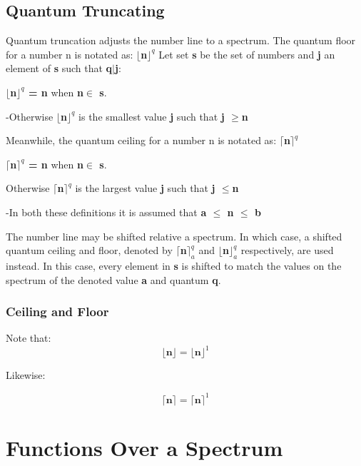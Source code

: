 \documentclass[12pt]{scrreprt}
\begin{document}
\section{Quantum Truncating}
Quantum truncation adjusts the number line to a spectrum. 
The quantum floor for a number n is notated as: \textbf{$\lfloor$n$\rfloor^q$}\newline
Let set \textbf{s} be the set of numbers and \textbf{j} an element of \textbf{s} such that \textbf{q$|$j}:\begin{center} \textbf{$\lfloor$n$\rfloor^q $ = n } when \textbf{n$\in$ s}.\end{center}\begin{center} -Otherwise \textbf{$\lfloor$n$\rfloor^q $} is the smallest value  \textbf{j} such that \textbf{j $\geq$n}\end{center}
Meanwhile, the quantum ceiling for a number n is notated as: \textbf{$\lceil$n$\rceil^q$}\newline
\begin{center} \textbf{$\lceil$n$\rceil^q $ = n } when \textbf{n$\in$ s}.\end{center}\begin{center} Otherwise \textbf{$\lceil$n$\rceil^q $} is the largest value  \textbf{j} such that \textbf{j $\leq$n}\end{center}\begin{center} -In both these definitions it is assumed that \textbf{a $\leq$ n $\leq$ b}\end{center}
The number line may be shifted relative a spectrum. In which case, a shifted quantum ceiling and floor, denoted by \textbf{$\lceil$n$\rceil_a^q $} and  \textbf{$\lfloor$n$\rfloor_a^q $ } respectively, are used instead. In this case, every element in \textbf{s} is shifted to match the values on the spectrum of the denoted value \textbf{a} and quantum \textbf{q}.   
\subsection{Ceiling and Floor}
Note that: \begin{equation}
\textbf{$\lfloor$n$\rfloor$} = \textbf{$\lfloor$n$\rfloor^1$} 
\end{equation}
\begin{center}
Likewise:\end{center}
 \begin{equation}
\textbf{$\lceil$n$\rceil$} = \textbf{$\lceil$n$\rceil^1$} 
\end{equation}
\chapter{Functions Over a Spectrum}
\end{document}

